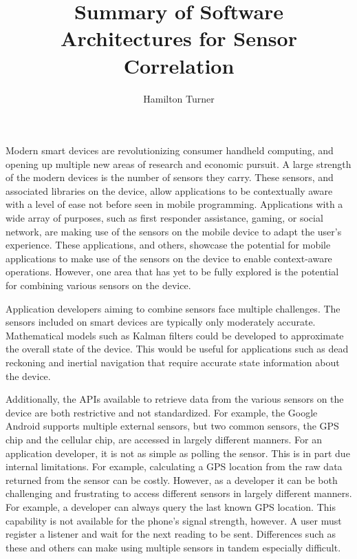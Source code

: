 \documentclass[11pt]{article}
\title{Summary of Software Architectures for Sensor Correlation}
\author{Hamilton Turner}
\begin{document}
\maketitle

Modern smart devices are revolutionizing consumer handheld computing, and opening up multiple new areas of research and economic pursuit. A large strength of the modern devices is the number of sensors they carry. These sensors, and associated libraries on the device, allow applications to be contextually aware with a level of ease not before seen in mobile programming. Applications with a wide array of purposes, such as first responder assistance, gaming, or social network, are making use of the sensors on the mobile device to adapt the user's experience. %
These applications, and others, showcase the potential for mobile applications to make use of the sensors on the device to enable context-aware operations. However, one area that has yet to be fully explored is the potential for combining various sensors on the device.

Application developers aiming to combine sensors face multiple challenges. The sensors included on smart devices are typically only moderately accurate. Mathematical models such as Kalman filters could be developed to approximate the overall state of the device. This would be useful for applications such as dead reckoning and inertial navigation that require accurate state information about the device. 

Additionally, the APIs available to retrieve data from the various sensors on the device are both restrictive and not standardized. For example, the Google Android supports multiple external sensors, but two common sensors, the GPS chip and the cellular chip, are accessed in largely different manners. For an application developer, it is not as simple as polling the sensor. This is in part due internal limitations. For example, calculating a GPS location from the raw data returned from the sensor can be costly. However, as a developer it can be both challenging and frustrating to access different sensors in largely different manners. For example, a developer can always query the last known GPS location. This capability is not available for the phone's signal strength, however. A user must register a listener and wait for the next reading to be sent. Differences such as these and others can make using multiple sensors in tandem especially difficult. 
\end{document}
